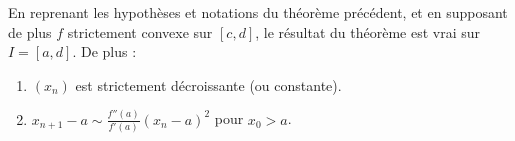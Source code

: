 	\begin{corollary}
		En reprenant les hypothèses et notations du théorème précédent, et en supposant de plus $f$ strictement convexe sur $[c, d]$, le résultat du théorème est vrai sur $I = [a, d]$. De plus :
		\begin{enumerate}[label=(\roman*)]
			\item $(x_n)$ est strictement décroissante (ou constante).
			\item $x_{n+1} - a \sim \frac{f''(a)}{f'(a)} (x_n - a)^2$ pour $x_0 > a$.
		\end{enumerate}
	\end{corollary}

